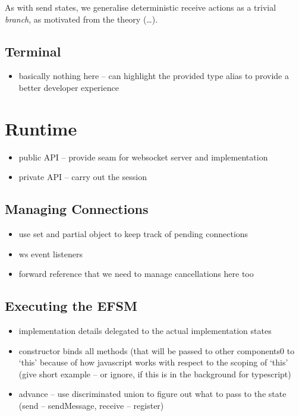 As with send states,
we generalise deterministic receive actions as a trivial \textit{branch}, 
as motivated from the theory (\dots).

\subsection{Terminal}
\begin{itemize}
\item basically nothing here -- can highlight the provided type alias to provide a better developer experience
\end{itemize}

\section{Runtime}
\label{section:noderuntime}

\begin{itemize}
\item public API -- provide seam for websocket server and implementation
\item private API -- carry out the session
\end{itemize}

\subsection{Managing Connections}
\begin{itemize}
\item use set and partial object to keep track of pending connections
\item ws event listeners
\item forward reference that we need to manage cancellations here too
\end{itemize}

\subsection{Executing the EFSM}
\begin{itemize}
\item implementation details delegated to the actual implementation states
\item constructor binds all methods (that will be passed to other components0 to `this' because of how javascript works with respect to the scoping of `this' (give short example -- or ignore, if this is in the background for typescript)
\item advance -- use discriminated union to figure out what to pass to the state (send -- sendMessage, receive -- register)
\end{itemize}


